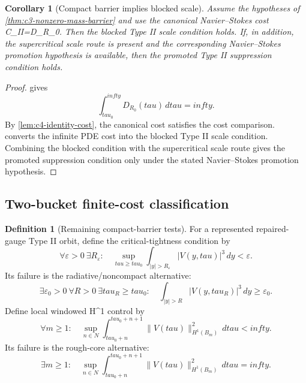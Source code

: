 \documentclass[11pt]{amsart}
\def\({}%
\def\){}%
\def\tilde#1{#1}%
\def\mathfrak#1{#1}%
\def\mathrm#1{#1}%
\def\mathbb#1{#1}%
\def\tau{tau}%
\def\infty{infty}%
\theoremstyle{plain}
\newtheorem{corollary}[theorem]{Corollary}
\theoremstyle{definition}
\newtheorem{definition}[theorem]{Definition}
\theoremstyle{remark}
\begin{document}
\begin{corollary}[Compact barrier implies blocked scale]
\label{cor:c4-compact-barrier-blocks-scale}
Assume the hypotheses of \cref{thm:c3-nonzero-mass-barrier} and use the canonical
Navier--Stokes cost \(\mathfrak C_{\mathrm{II}}=\tilde{\mathfrak D}_{R_0}\).
Then the blocked Type II scale condition holds.  If, in addition, the
supercritical scale route is present and the corresponding Navier--Stokes
promotion hypothesis is available, then the promoted Type II suppression
condition holds.
\end{corollary}

\begin{proof}
 gives
\[
  \int_{\tau_0}^{\infty}
  \tilde{\mathfrak D}_{R_0}(\tau)\,d\tau=\infty.
\]
By \cref{lem:c4-identity-cost}, the canonical cost satisfies the cost comparison.
 converts the infinite PDE cost into the blocked Type
II scale condition.  Combining the blocked condition with the supercritical
scale route gives the promoted suppression condition only under the stated
Navier--Stokes promotion hypothesis.
\end{proof}

\subsection{Two-bucket finite-cost classification}

\begin{definition}[Remaining compact-barrier tests]
\label{def:c5-compact-tests}
For a represented repaired-gauge Type II orbit, define the critical-tightness
condition by
\[
  \forall\varepsilon>0\ \exists R_\varepsilon:\quad
  \sup_{\tau\ge\tau_0}
  \int_{|y|>R_\varepsilon}|V(y,\tau)|^3\,dy<\varepsilon.
\]
Its failure is the radiative/noncompact alternative:
\[
  \exists\varepsilon_0>0\ \forall R>0\ \exists\tau_R\ge\tau_0:\quad
  \int_{|y|>R}|V(y,\tau_R)|^3\,dy\ge\varepsilon_0.
\]
Define local windowed \(H^1\) control by
\[
  \forall m\ge1:\quad
  \sup_{n\in\mathbb N}
  \int_{\tau_0+n}^{\tau_0+n+1}
  \|V(\tau)\|_{H^1(B_m)}^2\,d\tau<\infty.
\]
Its failure is the rough-core alternative:
\[
  \exists m\ge1:\quad
  \sup_{n\in\mathbb N}
  \int_{\tau_0+n}^{\tau_0+n+1}
  \|V(\tau)\|_{H^1(B_m)}^2\,d\tau=\infty.
\]
\end{definition}
\end{document}

